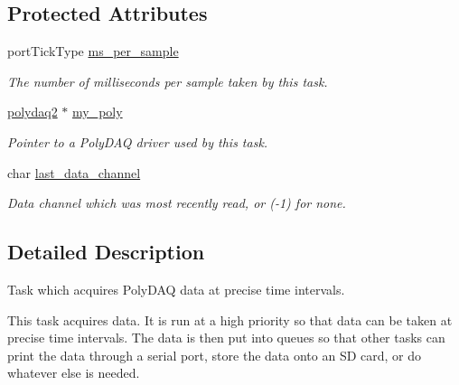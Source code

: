 \subsection*{Protected Attributes}
\begin{DoxyCompactItemize}
\item 
\hypertarget{classtask__data__acq_aa28c56651afdffa3c517b1f4a08984b2}{port\-Tick\-Type \hyperlink{classtask__data__acq_aa28c56651afdffa3c517b1f4a08984b2}{ms\-\_\-per\-\_\-sample}}\label{classtask__data__acq_aa28c56651afdffa3c517b1f4a08984b2}

\begin{DoxyCompactList}\small\item\em The number of milliseconds per sample taken by this task. \end{DoxyCompactList}\item 
\hypertarget{classtask__data__acq_a0d8e71bb08fb187b21229f7cf9e37f55}{\hyperlink{classpolydaq2}{polydaq2} $\ast$ \hyperlink{classtask__data__acq_a0d8e71bb08fb187b21229f7cf9e37f55}{my\-\_\-poly}}\label{classtask__data__acq_a0d8e71bb08fb187b21229f7cf9e37f55}

\begin{DoxyCompactList}\small\item\em Pointer to a Poly\-D\-A\-Q driver used by this task. \end{DoxyCompactList}\item 
\hypertarget{classtask__data__acq_a93280a27f68292672ab39c744182dbb0}{char \hyperlink{classtask__data__acq_a93280a27f68292672ab39c744182dbb0}{last\-\_\-data\-\_\-channel}}\label{classtask__data__acq_a93280a27f68292672ab39c744182dbb0}

\begin{DoxyCompactList}\small\item\em Data channel which was most recently read, or (-\/1) for none. \end{DoxyCompactList}\end{DoxyCompactItemize}


\subsection{Detailed Description}
Task which acquires Poly\-D\-A\-Q data at precise time intervals. 

This task acquires data. It is run at a high priority so that data can be taken at precise time intervals. The data is then put into queues so that other tasks can print the data through a serial port, store the data onto an S\-D card, or do whatever else is needed. 

